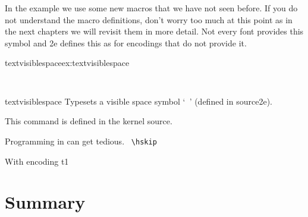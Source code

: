 In the example we use some new macros that we have not seen before. If you do not understand
the macro definitions, don't worry too much at this point as in the next chapters we will revisit
them in more detail. Not every font provides this symbol and \latex2e defines this as for encodings
that do not provide it.

\begin{texexample}{textvisiblespace}{ex:textvisiblespace}
\meaning\textvisiblespace
\makeatletter
\def\textvisiblespace{%
 \mbox{\kern.06em\vrule \@height.3ex}%
  \vbox{\hrule \@width.3em}%
  \hbox{\vrule \@height.3ex}}
\makeatother

\verb*+  +
\end{texexample}




\begin{docCommand}{textvisiblespace}{}
Typesets a visible space symbol `\verb*+ +' (defined in source2e).
\end{docCommand}

This command is defined in the kernel source. 


  
Programming in \tex can get tedious. \textvisiblespace \verb*+ \hskip+


With encoding t1


\section{Summary}
 
